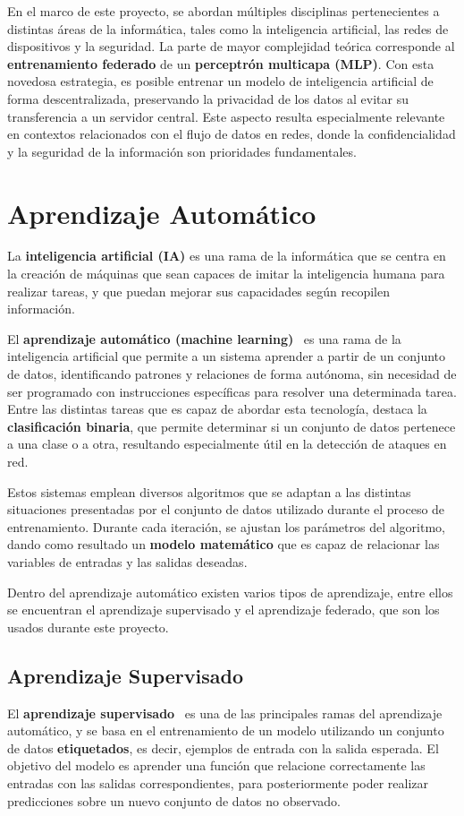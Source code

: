 En el marco de este proyecto, se abordan múltiples disciplinas pertenecientes a distintas áreas de la informática, tales como la inteligencia artificial, las redes de dispositivos y la seguridad.
La parte de mayor complejidad teórica corresponde al \textbf{entrenamiento federado} de un \textbf{perceptrón multicapa  (MLP)}. Con esta novedosa estrategia, es posible entrenar un modelo de inteligencia artificial de forma descentralizada, preservando la privacidad de los datos al evitar su transferencia a un servidor central. Este aspecto resulta especialmente relevante en contextos relacionados con el flujo de datos en redes, donde la confidencialidad y la seguridad de la información son prioridades fundamentales.

\section{Aprendizaje Automático}
\label{sec:AprendizajeAutomático}
La \textbf{inteligencia artificial (IA)} es una rama de la informática que se centra en la creación de máquinas que sean capaces de imitar la inteligencia humana para realizar tareas, y que puedan mejorar sus capacidades según recopilen información.

El \textbf{aprendizaje automático (machine learning)}~\cite{machine_learning} es una rama de la inteligencia artificial que permite a un sistema aprender a partir de un conjunto de datos, identificando patrones y relaciones de forma autónoma, sin necesidad de ser programado con instrucciones específicas para resolver una determinada tarea. Entre las distintas tareas que es capaz de abordar esta tecnología, destaca la \textbf{clasificación binaria}, que permite determinar si un conjunto de datos pertenece a una clase o a otra, resultando especialmente útil en la detección de ataques en red.

Estos sistemas emplean diversos algoritmos que se adaptan a las distintas situaciones presentadas por el conjunto de datos utilizado durante el proceso de entrenamiento. Durante cada iteración, se ajustan los parámetros del algoritmo, dando como resultado un \textbf{modelo matemático} que es capaz de relacionar las variables de entradas y las salidas deseadas.

Dentro del aprendizaje automático existen varios tipos de aprendizaje, entre ellos se encuentran el aprendizaje supervisado y el aprendizaje federado, que son los usados durante este proyecto.

\subsection{Aprendizaje Supervisado}
\label{subsec:AprendizajeSupervisado}
El \textbf{aprendizaje supervisado}~\cite{aprendizaje_supervisado} es una de las principales ramas del aprendizaje automático, y se basa en el entrenamiento de un modelo utilizando un conjunto de datos \textbf{etiquetados}, es decir, ejemplos de entrada con la salida esperada. El objetivo del modelo es aprender una función que relacione correctamente las entradas con las salidas correspondientes, para posteriormente poder realizar predicciones sobre un nuevo conjunto de datos no observado.

